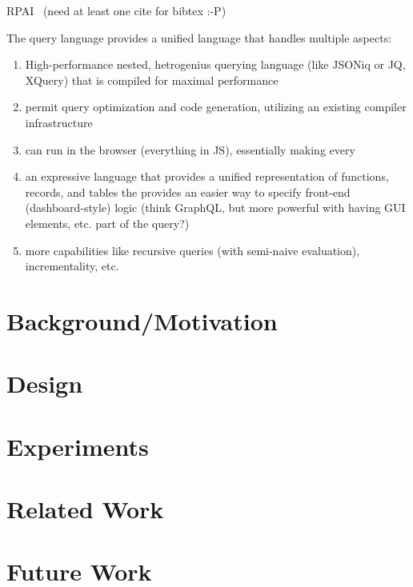 \documentclass[runningheads]{llncs}
\begin{document}
RPAI~\cite{rpai} (need at least one cite for bibtex :-P)

The query language provides a unified language that handles multiple aspects:

\begin{enumerate}
    \item High-performance nested, hetrogenius querying language (like JSONiq or JQ, XQuery)
    that is compiled for maximal performance

    \item permit query optimization and code generation, utilizing an existing compiler
    infrastructure

    \item can run in the browser (everything in JS), essentially making every 

    \item an expressive language that provides a unified representation of functions,
     records, and tables the provides an easier way to specify front-end (dashboard-style) logic
    (think GraphQL, but more powerful with having GUI elements, etc. part of the query?)
    \item more capabilities like recursive queries (with semi-naive evaluation),
    incrementality, etc.
\end{enumerate}

\section{Background/Motivation}

\section{Design}

\section{Experiments}

\section{Related Work}

\section{Future Work}
%
%



\end{document}
